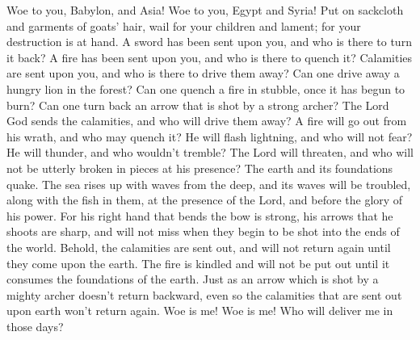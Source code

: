  Woe to you, Babylon, and Asia! Woe to you, Egypt and
Syria!  Put on sackcloth and garments of goats' hair, wail
for your children and lament; for your destruction is at hand.
 A sword has been sent upon you, and who is there to turn
it back?  A fire has been sent upon you, and who is there
to quench it?  Calamities are sent upon you, and who is
there to drive them away?  Can one drive away a hungry
lion in the forest? Can one quench a fire in stubble, once it has begun
to burn?  Can one turn back an arrow that is shot by a
strong archer?  The Lord God sends the calamities, and who
will drive them away?  A fire will go out from his wrath,
and who may quench it?  He will flash lightning, and who
will not fear? He will thunder, and who wouldn't tremble?
 The Lord will threaten, and who will not be utterly
broken in pieces at his presence?  The earth and its
foundations quake. The sea rises up with waves from the deep, and its
waves will be troubled, along with the fish in them, at the presence of
the Lord, and before the glory of his power.  For his
right hand that bends the bow is strong, his arrows that he shoots are
sharp, and will not miss when they begin to be shot into the ends of the
world.  Behold, the calamities are sent out, and will not
return again until they come upon the earth.  The fire is
kindled and will not be put out until it consumes the foundations of the
earth.  Just as an arrow which is shot by a mighty archer
doesn't return backward, even so the calamities that are sent out upon
earth won't return again.  Woe is me! Woe is me! Who will
deliver me in those days?

